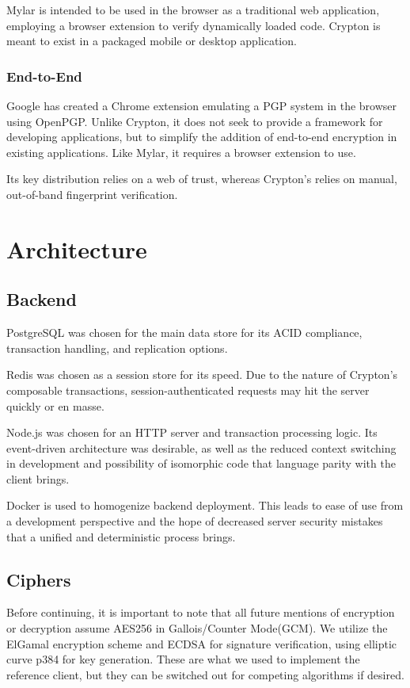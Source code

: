 \documentclass[conference]{IEEEtran}
\begin{document}
Mylar is intended to be used in the browser as a traditional web application,
employing a browser extension to verify dynamically loaded code. Crypton is meant
to exist in a packaged mobile or desktop application.

\subsubsection{End-to-End}
Google has created a Chrome extension\cite{endtoendblog} emulating a
PGP system in the browser using OpenPGP\cite{endtoend}. Unlike Crypton,
it does not seek to provide a framework for developing applications,
but to simplify the addition of end-to-end encryption in existing applications.
Like Mylar, it requires a browser extension to use.

Its key distribution relies on a web of trust\cite{endtoendkeydistribution},
whereas Crypton's relies on manual, out-of-band fingerprint verification.

\section{Architecture}

\subsection{Backend}
PostgreSQL was chosen for the main data store for its ACID compliance,
transaction handling, and replication options.

Redis was chosen as a session store for its speed.
Due to the nature of Crypton's composable transactions,
session-authenticated requests may hit the server quickly or en masse.

Node.js was chosen for an HTTP server and transaction processing logic.
Its event-driven architecture was desirable, as well as the reduced
context switching in development and possibility of isomorphic code
that language parity with the client brings.

Docker is used to homogenize backend deployment. This leads to ease of
use from a development perspective and the hope of decreased server
security mistakes that a unified and deterministic process brings.

\subsection{Ciphers}
Before continuing, it is important to note that all future mentions
of encryption or decryption assume AES256 in Gallois/Counter Mode(GCM)\cite{gcm}.
We utilize the ElGamal\cite{elgamal} encryption scheme and ECDSA\cite{ecdsa}
for signature verification, using elliptic curve p384\cite{curves} for key generation.
These are what we used to implement the reference client, but they can
be switched out for competing algorithms if desired.
\end{document}
